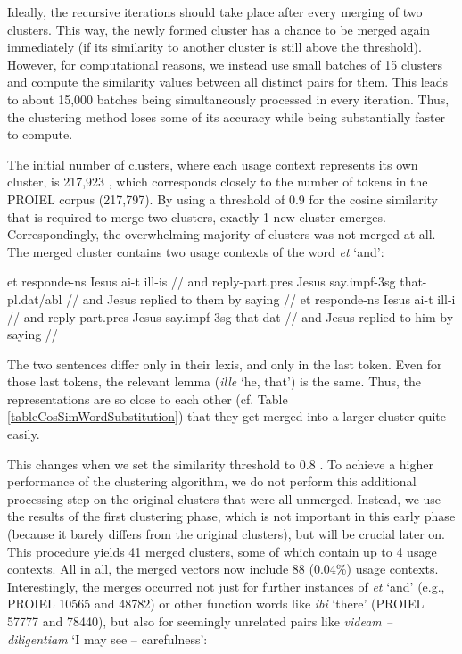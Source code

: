 \documentclass[oneside]{book}
\begin{document}
Ideally, the recursive iterations should take place after every merging of two clusters. This way, the newly formed cluster has a chance to be merged again immediately (if its similarity to another cluster is still above the threshold). However, for computational reasons, we instead use small batches of 15 clusters and compute the similarity values between all distinct pairs for them. This leads to about 15,000 batches being simultaneously processed in every iteration. Thus, the clustering method loses some of its accuracy while being substantially faster to compute.

The initial number of clusters, where each usage context represents its own cluster, is 217,923 , which corresponds closely to the number of tokens in the PROIEL corpus (217,797). 
By using a threshold of 0.9 for the cosine similarity that is required to merge two clusters, exactly 1 new cluster emerges. Correspondingly, the overwhelming majority of clusters was not merged at all. The merged cluster contains two usage contexts of the word \textit{et} `and':

\vspace{10pt}
\ex[exno=PROIEL 11203]
	\begingl
		\gla et responde-ns Iesus ai-t ill-is //
		\glb and reply-{\sc part.pres} Jesus say.{\sc impf-3sg} that-{\sc pl.dat/abl} //
		\glft and Jesus replied to them by saying //
	\endgl
\xe 
\vspace{10pt}
\ex[exno=PROIEL 16513]
	\begingl
		\gla et responde-ns Iesus ai-t ill-i //
		\glb and reply-{\sc part.pres} Jesus say.{\sc impf-3sg} that-{\sc dat} //
		\glft and Jesus replied to him by saying //
	\endgl
\xe
\vspace{10pt}

The two sentences differ only in their lexis, and only in the last token. Even for those last tokens, the relevant lemma (\textit{ille} `he, that') is the same. Thus, the representations are so close to each other (cf. Table \ref{tableCosSimWordSubstitution}) that they get merged into a larger cluster quite easily.

This changes when we set the similarity threshold to 0.8 . To achieve a higher performance of the clustering algorithm, we do not perform this additional processing step on the original clusters that were all unmerged. Instead, we use the results of the first clustering phase, which is not important in this early phase (because it barely differs from the original clusters), but will be crucial later on. This procedure yields 41 merged clusters, some of which contain up to 4 usage contexts. All in all, the merged vectors now include 88 (0.04\%) usage contexts. Interestingly, the merges occurred not just for further instances of \textit{et} `and' (e.g., PROIEL 10565 and 48782) or other function words like \textit{ibi} `there' (PROIEL 57777 and 78440), but also for seemingly unrelated pairs like \textit{videam -- diligentiam} `I may see -- carefulness': 
\end{document}
